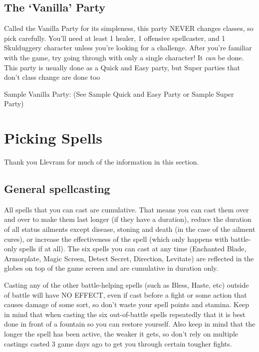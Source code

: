 \documentclass[12pt]{article}
\begin{document}
\subsection{\texorpdfstring{The `Vanilla'
Party}{The Vanilla Party}}\label{the-vanilla-party}

Called the Vanilla Party for its simpleness, this party NEVER changes
classes, so pick carefully. You'll need at least 1 healer, 1 offensive
spellcaster, and 1 Skulduggery character unless you're looking for a
challenge. After you're familiar with the game, try going through with
only a single character! It \emph{can} be done. This party is usually
done as a Quick and Easy party, but Super parties that don't class
change are done too

Sample Vanilla Party: (See Sample Quick and Easy Party or Sample Super
Party)

\section{Picking Spells}\label{picking-spells}

Thank you Llevram for much of the information in this section.

\subsection{General spellcasting}\label{general-spellcasting}

All spells that you can cast are cumulative. That means you can cast
them over and over to make them last longer (if they have a duration),
reduce the duration of all status ailments except disease, stoning and
death (in the case of the ailment cures), or increase the effectiveness
of the spell (which only happens with battle-only spells if at all). The
six spells you can cast at any time (Enchanted Blade, Armorplate, Magic
Screen, Detect Secret, Direction, Levitate) are reflected in the globes
on top of the game screen and are cumulative in duration only.

Casting any of the other battle-helping spells (such as Bless, Haste,
etc) outside of battle will have NO EFFECT, even if cast before a fight
or some action that causes damage of some sort, so don't waste your
spell points and stamina. Keep in mind that when casting the six
out-of-battle spells repeatedly that it is best done in front of a
fountain so you can restore yourself. Also keep in mind that the longer
the spell has been active, the weaker it gets, so don't rely on multiple
castings casted 3 game days ago to get you through certain tougher
fights.
\end{document}
